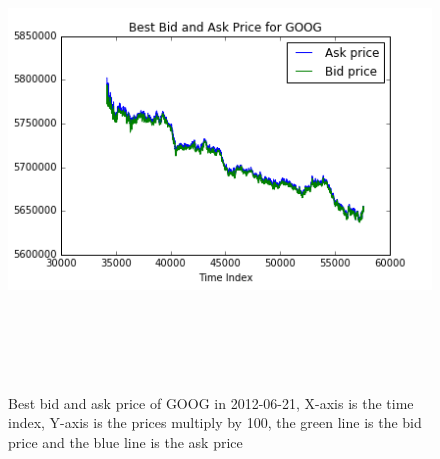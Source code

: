 \begin{figure} [hp]
  \begin{center}
    \includegraphics[width=6in,  height=5in]{figures/GOOG_price.png}
  \end{center}
\caption{Best bid and ask price of GOOG in 2012-06-21,    X-axis is the time index,   Y-axis is the prices multiply by 100,   the green line is the bid price and the blue line is the ask price} \label{fig:goog_price}
\end{figure}

